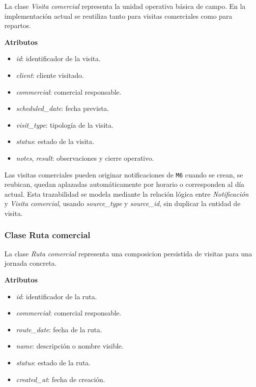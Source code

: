 La clase \textit{Visita comercial} representa la unidad operativa básica de campo. En la implementación actual se reutiliza tanto para visitas comerciales como para repartos.

\textbf{Atributos}

\begin{itemize}
      \item \textit{id}: identificador de la visita.
      \item \textit{client}: cliente visitado.
      \item \textit{commercial}: comercial responsable.
      \item \textit{scheduled\_date}: fecha prevista.
      \item \textit{visit\_type}: tipología de la visita.
      \item \textit{status}: estado de la visita.
      \item \textit{notes}, \textit{result}: observaciones y cierre operativo.
\end{itemize}

Las visitas comerciales pueden originar notificaciones de \texttt{M6} cuando se crean, se reubican, quedan aplazadas automáticamente por horario o corresponden al día actual. Esta trazabilidad se modela mediante la relación lógica entre \textit{Notificación} y \textit{Visita comercial}, usando \textit{source\_type} y \textit{source\_id}, sin duplicar la entidad de visita.

\subsubsection{Clase Ruta comercial}

La clase \textit{Ruta comercial} representa una composicion persistida de visitas para una jornada concreta.

\textbf{Atributos}

\begin{itemize}
      \item \textit{id}: identificador de la ruta.
      \item \textit{commercial}: comercial responsable.
      \item \textit{route\_date}: fecha de la ruta.
      \item \textit{name}: descripción o nombre visible.
      \item \textit{status}: estado de la ruta.
      \item \textit{created\_at}: fecha de creación.
\end{itemize}

